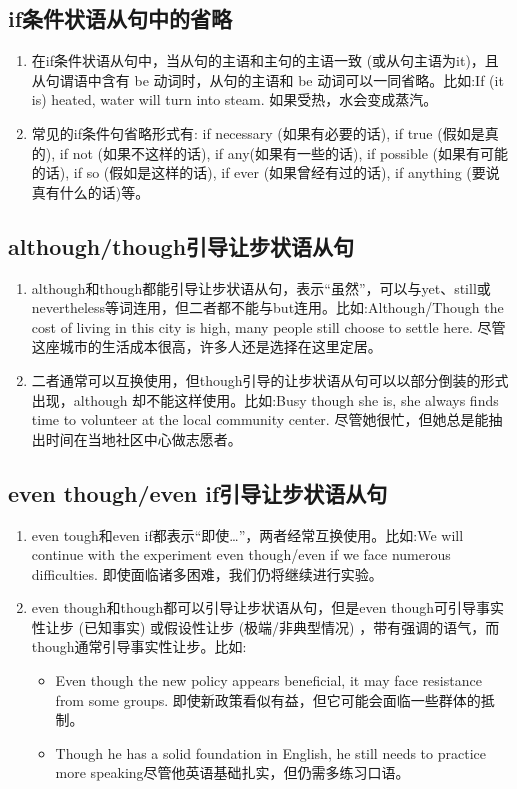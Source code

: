 \subsection{if条件状语从句中的省略}

\begin{enumerate}
  \item 在if条件状语从句中，当从句的主语和主句的主语一致 (或从句主语为it)，且从句谓语中含有 be 动词时，从句的主语和 be 动词可以一同省略。比如:If (it is) heated, water will turn into steam. 如果受热，水会变成蒸汽。
  \item 常见的if条件句省略形式有: if necessary (如果有必要的话), if true (假如是真的), if not (如果不这样的话), if any(如果有一些的话), if possible (如果有可能的话), if so (假如是这样的话), if ever (如果曾经有过的话), if anything (要说真有什么的话)等。
\end{enumerate}

\subsection{although/though引导让步状语从句}

\begin{enumerate}
  \item although和though都能引导让步状语从句，表示“虽然”，可以与yet、still或nevertheless等词连用，但二者都不能与but连用。比如:Although/Though the cost of living in this city is high, many people still choose to settle here. 尽管这座城市的生活成本很高，许多人还是选择在这里定居。
  \item 二者通常可以互换使用，但though引导的让步状语从句可以以部分倒装的形式出现，although 却不能这样使用。比如:Busy though she is, she always finds time to volunteer at the local community center. 尽管她很忙，但她总是能抽出时间在当地社区中心做志愿者。
\end{enumerate}

\subsection{even though/even if引导让步状语从句}

\begin{enumerate}
  \item even tough和even if都表示“即使…”，两者经常互换使用。比如:We will continue with the experiment even though/even if we face numerous difficulties. 即使面临诸多困难，我们仍将继续进行实验。
  \item even though和though都可以引导让步状语从句，但是even though可引导事实性让步 (已知事实) 或假设性让步 (极端/非典型情况) ，带有强调的语气，而though通常引导事实性让步。比如:
        \begin{itemize}
          \item Even though the new policy appears beneficial, it may face resistance from some groups. 即使新政策看似有益，但它可能会面临一些群体的抵制。
          \item Though he has a solid foundation in English, he still needs to practice more speaking尽管他英语基础扎实，但仍需多练习口语。
        \end{itemize}
\end{enumerate}

